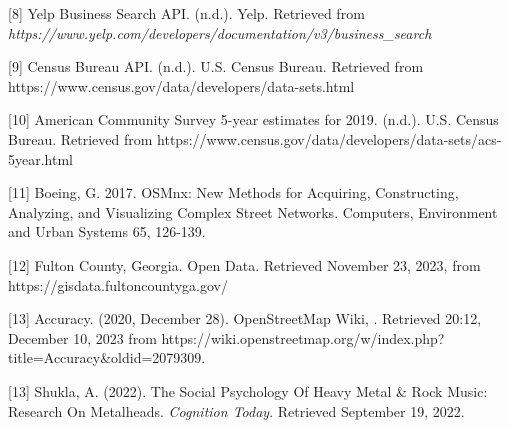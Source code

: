 \documentclass[11pt]{article}
\begin{document}
{[}8{]} Yelp Business Search API. (n.d.). Yelp. Retrieved from \textit{https://www.yelp.com/developers/documentation/v3/business\_search}

{[}9{]} Census Bureau API. (n.d.). U.S. Census Bureau. Retrieved from https://www.census.gov/data/developers/data-sets.html

{[}10{]} American Community Survey 5-year estimates for 2019. (n.d.). U.S. Census Bureau. Retrieved from https://www.census.gov/data/developers/data-sets/acs-5year.html

{[}11{]} Boeing, G. 2017. OSMnx: New Methods for Acquiring, Constructing, Analyzing, and Visualizing Complex Street Networks. Computers, Environment and Urban Systems 65, 126-139.

{[}12{]} Fulton County, Georgia. Open Data. Retrieved November 23, 2023, from https://gisdata.fultoncountyga.gov/

{[}13{]} Accuracy. (2020, December 28). OpenStreetMap Wiki, . Retrieved 20:12, December 10, 2023 from https://wiki.openstreetmap.org/w/index.php?title=Accuracy\&oldid=2079309.

{[}13{]} Shukla, A. (2022). The Social Psychology Of Heavy Metal \& Rock Music: Research On Metalheads. \textit{Cognition Today}. Retrieved September 19, 2022.











    
    
    
\end{document}

